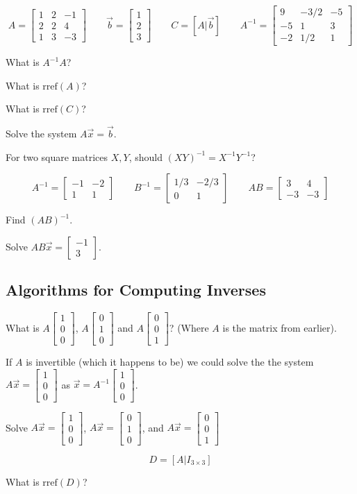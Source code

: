 \documentclass{article}
\newcommand{\rref}{\mathrm{rref}}
\newcommand{\mat}[1]{\begin{bmatrix}#1\end{bmatrix}}
\begin{document}
	\[
		A=\mat{1&2&-1\\2&2&4\\1&3&-3}\qquad
		\vec b=\mat{1\\2\\3}\qquad
		C=[A|\vec b]\qquad
		A^{-1}=\mat{9&-3/2&-5\\-5&1&3\\-2&1/2&1}
	\]
	\begin{Enum}
		\item What is $A^{-1}A$?
		\item What is $\rref(A)$?
		\item What is $\rref(C)$?
		\item Solve the system $A\vec x=\vec b$.
	\end{Enum}
	\begin{Enum}
		\item For two square matrices $X,Y$, should $(XY)^{-1}=X^{-1}Y^{-1}$?
	\end{Enum}
	\[
		A^{-1}=\mat{-1&-2\\1&1}\qquad B^{-1}=\mat{1/3&-2/3\\0&1}\qquad 
		AB=\mat{3&4\\-3&-3}
	\]
	\begin{Enum}
		\item Find $(AB)^{-1}$.
		\item Solve $AB\vec x=\mat{-1\\3}$.
	\end{Enum}
\subsection*{Algorithms for Computing Inverses}
	\begin{Enum}
		\item What is $A\mat{1\\0\\0}$, $A\mat{0\\1\\0}$
			and $A\mat{0\\0\\1}$? (Where $A$ is the matrix from earlier).
	\end{Enum}
	If $A$ is invertible (which it happens to be) we could solve the 
	the system $A\vec x=\mat{1\\0\\0}$ as $\vec x=A^{-1}\mat{1\\0\\0}$.

	\begin{Enum}[resume]
		\item Solve $A\vec x=\mat{1\\0\\0}$,  $A\vec x=\mat{0\\1\\0}$, 
			and $A\vec x=\mat{0\\0\\1}$
	\end{Enum}
	\[
		D=[A|I_{3\times 3}]
	\]
	\begin{Enum}[resume]
	\item What is $\rref(D)$?
	\end{Enum}
\end{document}
